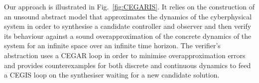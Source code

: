 \documentclass[sigconf]{llncs}
\begin{document}


Our approach is illustrated in Fig.~\ref{fig:CEGARIS}. It relies on the
construction of an unsound abstract model that approximates the dynamics
of the cyberphysical system in order to synthesise a candidate controller
and observer and then verify its behaviour against a sound overapproximation
of the concrete dynamics of the system for an infinite space over an infinite
time horizon.
The verifier's abstraction uses a CEGAR loop in order to minimise 
overapproximation errors and provides counterexamples for both
discrete and continuous dynamics to feed a CEGIS loop on the synthesiser
waiting for a new candidate solution. 
\end{document}
